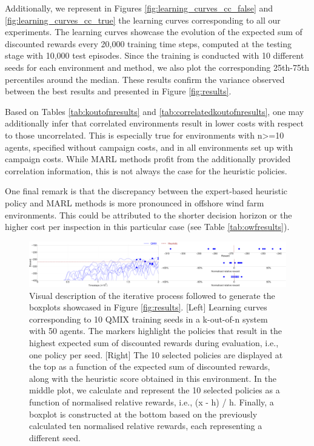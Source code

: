 Additionally, we represent in Figures \ref{fig:learning_curves_cc_false} and \ref{fig:learning_curves_cc_true} the learning curves corresponding to all our experiments.
The learning curves showcase the evolution of the expected sum of discounted rewards every 20,000 training time steps, computed at the testing stage with 10,000 test episodes.
Since the training is conducted with 10 different seeds for each environment and method, we also plot the corresponding 25th-75th percentiles around the median.
These results confirm the variance observed between the best results and presented in Figure \ref{fig:results}.

Based on Tables \ref{tab:koutofnresults} and \ref{tab:correlatedkoutofnresults}, one may additionally infer that correlated environments result in lower costs with respect to those uncorrelated.
This is especially true for environments with n>=10 agents, specified without campaign costs, and in all environments set up with campaign costs.
While MARL methods profit from the additionally provided correlation information, this is not always the case for the heuristic policies.

One final remark is that the discrepancy between the expert-based heuristic policy and MARL methods is more pronounced in offshore wind farm environments. 
This could be attributed to the shorter decision horizon or the higher cost per inspection in this particular case (see Table \ref{tab:owfresults}).

\begin{figure}
    \centering
    \includegraphics[width=\textwidth]{tex_thesis/figures/ch5/plot_explain_plot_gaussian.pdf}
    \caption{Visual description of the iterative process followed to generate the boxplots showcased in Figure \ref{fig:results}.
[Left] Learning curves corresponding to 10 QMIX training seeds in a k-out-of-n system with 50 agents. 
The markers highlight the policies that result in the highest expected sum of discounted rewards during evaluation, i.e., one policy per seed.
[Right] The 10 selected policies are displayed at the top as a function of the expected sum of discounted rewards, along with the heuristic score obtained in this environment.
In the middle plot, we calculate and represent the 10 selected policies as a function of normalised relative rewards, i.e., (x - h) / h.
Finally, a boxplot is constructed at the bottom based on the previously calculated ten normalised relative rewards, each representing a different seed.
}
\label{fig:explain_fig}
\end{figure}

